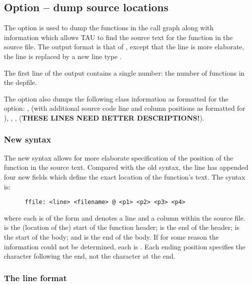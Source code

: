 \subsection{Option  -- dump source locations}

The  option is used to dump the functions in the call
graph along with information which allows TAU to find the source text
for the function in the source file. The output format is that of
, except that the  line is more elaborate,
the  line is replaced by a new line type .

The first line of the output contains a single number: the number of functions
in the depfile.

The  option also dumps the following class information as
formatted for the  option: 
,  (with additional source code line and column
positions as formatted for ), , , 
 ({\bf THESE LINES NEED BETTER DESCRIPTIONS!}).



\subsubsection{New  syntax}

The new  syntax allows for more elaborate specification of the
position of the function in the source text. Compared with the old syntax, 
the line has appended four new fields which define the exact location of the
function's text. The syntax is:
\begin{verbatim}
      ffile: <line> <filename> @ <p1> <p2> <p3> <p4>
\end{verbatim}
\noindent
where each  is of the form  and denotes a
line and a column within the source file.  is the (location
of the) start of the function header;  is the end of the
header;  is the start of the body; and  is the end
of the body. If for some reason the information could not be determined,
each  is \code{-}. Each ending position specifies the character
following the end, not the character at the end.

\subsubsection{The  line format}

